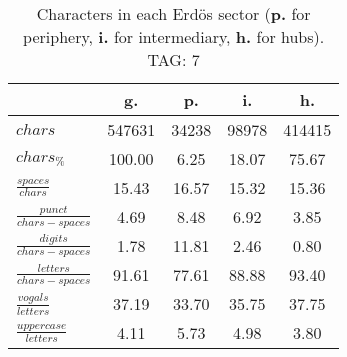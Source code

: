 \begin{table}[h!]
\begin{center}
\begin{tabular}{| l || c | c | c | c |}\hline
 & {\bf g.} & {\bf p.} & {\bf i.} & {\bf h.} \\\hline\hline
$chars$ & 547631  & 34238  & 98978  & 414415 \\
$chars_{\%}$ & 100.00  & 6.25  & 18.07  & 75.67 \\\hline
$\frac{spaces}{chars}$ & 15.43  & 16.57  & 15.32  & 15.36 \\
$\frac{punct}{chars-spaces}$ & 4.69  & 8.48  & 6.92  & 3.85 \\
$\frac{digits}{chars-spaces}$ & 1.78  & 11.81  & 2.46  & 0.80 \\\hline
$\frac{letters}{chars-spaces}$ & 91.61  & 77.61  & 88.88  & 93.40 \\
$\frac{vogals}{letters}$ & 37.19  & 33.70  & 35.75  & 37.75 \\
$\frac{uppercase}{letters}$ & 4.11  & 5.73  & 4.98  & 3.80 \\\hline
\end{tabular}
\caption{Characters in each Erd\"os sector ({{\bf p.}} for periphery, {{\bf i.}} for intermediary, 
    {{\bf h.}} for hubs). TAG: 7}
\end{center}
\end{table}